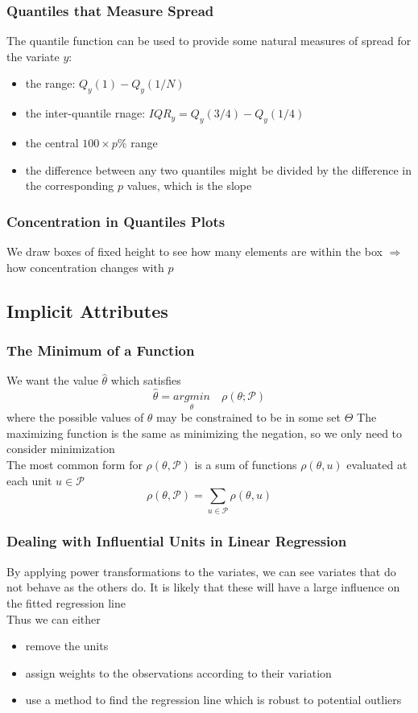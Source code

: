 \documentclass[11pt]{article}
\begin{document}
\subsubsection*{Quantiles that Measure Spread}
The quantile function can be used to provide some natural measures of spread for the variate $y$:
\begin{itemize}
    \item the range: $Q_y(1)-Q_y(1/N)$
    \item the inter-quantile rnage: $IQR_y=Q_y(3/4)-Q_y(1/4)$
    \item the central $100\times p\%$ range
    \item the difference between any two quantiles might be divided by the difference in the corresponding $p$ values, which is the slope 
\end{itemize}
\subsubsection*{Concentration in Quantiles Plots}
We draw boxes of fixed height to see how many elements are within the box $\Rightarrow$ how concentration changes with $p$
\subsection{Implicit Attributes}
\subsubsection{The Minimum of a Function}
We want the value $\hat{\theta}$ which satisfies 
\[\hat{\theta} = \underset{\theta}{argmin} \quad \rho(\theta;\mathcal{P})\]
where the possible values of $\theta$ may be constrained to be in some set $\Theta$
The maximizing function is the same as minimizing the negation, so we only need to consider minimization \\
The most common form for $\rho(\theta,\mathcal{P})$ is a sum of functions $\rho(\theta,u)$ evaluated at each unit $u\in\mathcal{P}$
\[\rho(\theta,\mathcal{P}) = \sum_{u\in\mathcal{P}}\rho(\theta,u)\]
\subsubsection{Dealing with Influential Units in Linear Regression}
By applying power transformations to the variates, we can see variates that do not behave as the others do. It is likely 
that these will have a large influence on the fitted regression line \\
Thus we can either
\begin{itemize}
    \item remove the units
    \item assign weights to the observations according to their variation 
    \item use a method to find the regression line which is robust to potential outliers
\end{itemize}
\end{document}
